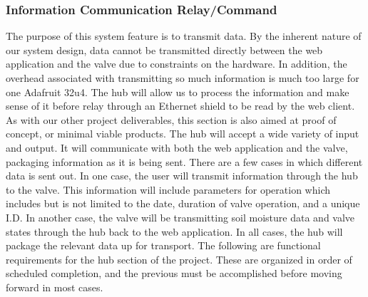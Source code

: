 \documentclass[onecolumn, draftclsnofoot,10pt, compsoc]{IEEEtran}
\newcounter{subsubsubsection}[subsubsection]
\begin{document}
	\subsubsection{Information Communication Relay/Command}
	The purpose of this system feature is to transmit data.
	By the inherent nature of our system design, data cannot be transmitted directly between the web application and the valve due to constraints on the hardware.
	In addition, the overhead associated with transmitting so much information is much too large for one Adafruit 32u4. 
	The hub will allow us to process the information and make sense of it before relay through an Ethernet shield to be read by the web client. 
	As with our other project deliverables, this section is also aimed at proof of concept, or minimal viable products.
	The hub will accept a wide variety of input and output.
	It will communicate with both the web application and the valve, packaging information as it is being sent.
	There are a few cases in which different data is sent out.
	In one case, the user will transmit information through the hub to the valve. 
	This information will include parameters for operation which includes but is not limited to the date, duration of valve operation, and a unique I.D.
	In another case, the valve will be transmitting soil moisture data and valve states through the hub back to the web application. 
	In all cases, the hub will package the relevant data up for transport. 
	The following are functional requirements for the hub section of the project. 
	These are organized in order of scheduled completion, and the previous must be accomplished before moving forward in most cases.
\end{document}
